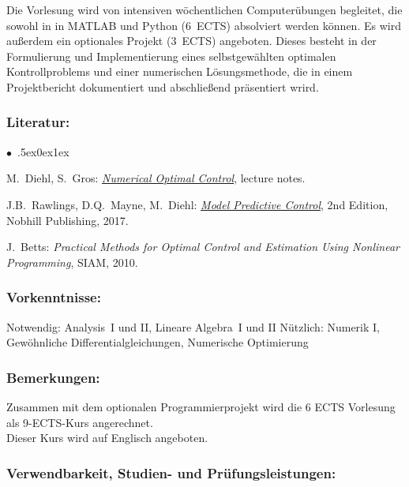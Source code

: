 \documentclass[a4paper,10pt]{article}
\renewenvironment{itemize}{\begin{list}{$\bullet$\ }{\itemsep.5ex\setlength{\topsep}{0.5\itemsep}\parsep0ex\labelsep1ex\settowidth{\labelwidth}{$\bullet$\ }\setlength{\leftmargin}{\labelwidth}\addtolength{\leftmargin}{3ex}\addtolength{\leftmargin}{\labelsep}}}{\end{list}}
\begin{document}
Die Vorlesung wird von intensiven wöchentlichen Computerübungen begleitet, die sowohl in in MATLAB und Python (6~ECTS) absolviert werden können. Es wird außerdem ein optionales Projekt (3~ECTS) angeboten. Dieses besteht in der Formulierung und Implementierung eines selbstgewählten optimalen Kontrollproblems und einer numerischen Lösungsmethode, die in einem Projektbericht dokumentiert und abschließend präsentiert wrird.
\subsubsection*{\large
    Literatur:
}
\begin{itemize}
\item
 M.~Diehl, S.~Gros: \href{https://www.syscop.de/files/2020ss/NOC/book-NOCSE.pdf}{\emph{Numerical Optimal Control}}, lecture notes. 
\item
J.B.~Rawlings, D.Q.~Mayne, M.~Diehl: \href{https://sites.engineering.ucsb.edu/\~jbraw/mpc/MPC-book-2nd-edition-4th-printing.pdf}{\emph{Model Predictive Control}}, 2nd Edition, Nobhill Publishing, 2017.
\item
J.~Betts: \emph{Practical Methods for Optimal Control and Estimation Using Nonlinear Programming}, SIAM, 2010.
\end{itemize}
\subsubsection*{\large
    Vorkenntnisse:
}
Notwendig: Analysis~I und II, Lineare Algebra~I und II Nützlich: Numerik I, Gewöhnliche Differentialgleichungen, Numerische Optimierung
\subsubsection*{\large
    Bemerkungen:
}
Zusammen mit dem optionalen Programmierprojekt wird die 6 ECTS Vorlesung als 9-ECTS-Kurs angerechnet.\\
Dieser Kurs wird auf Englisch angeboten.
\cleardoublepage
\subsubsection*{\large
    Verwendbarkeit, Studien- und Prüfungsleistungen:
}
\end{document}
